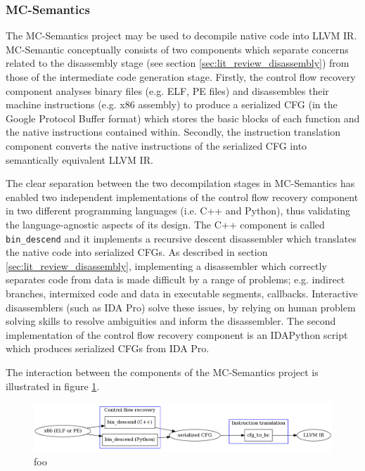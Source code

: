 
\subsubsection{MC-Semantics}
\label{sec:rel_work_mc-semantics}

The MC-Semantics project may be used to decompile native code into LLVM IR. MC-Semantic conceptually consists of two components which separate concerns related to the disassembly stage (see section \ref{sec:lit_review_disassembly}) from those of the intermediate code generation stage. Firstly, the control flow recovery component analyses binary files (e.g. ELF, PE files) and disassembles their machine instructions (e.g. x86 assembly) to produce a serialized CFG (in the Google Protocol Buffer format) which stores the basic blocks of each function and the native instructions contained within. Secondly, the instruction translation component converts the native instructions of the serialized CFG into semantically equivalent LLVM IR.

The clear separation between the two decompilation stages in MC-Semantics has enabled two independent implementations of the control flow recovery component in two different programming languages (i.e. C++ and Python), thus validating the language-agnostic aspects of its design. The C++ component is called \texttt{bin\_descend} and it implements a recursive descent disassembler which translates the native code into serialized CFGs. As described in section \ref{sec:lit_review_disassembly}, implementing a disassembler which correctly separates code from data is made difficult by a range of problems; e.g. indirect branches, intermixed code and data in executable segments, callbacks. Interactive disassemblers (such as IDA Pro) solve these issues, by relying on human problem solving skills to resolve ambiguities and inform the disassembler. The second implementation of the control flow recovery component is an IDAPython script which produces serialized CFGs from IDA Pro.

The interaction between the components of the MC-Semantics project is illustrated in figure \ref{fig:mcsema_overview}.

\begin{figure}[htbp]
	\includegraphics[width=\textwidth]{inc/3_rel_work/mcsema_overview.png}
	\caption{foo}
	\label{fig:mcsema_overview}
\end{figure}

